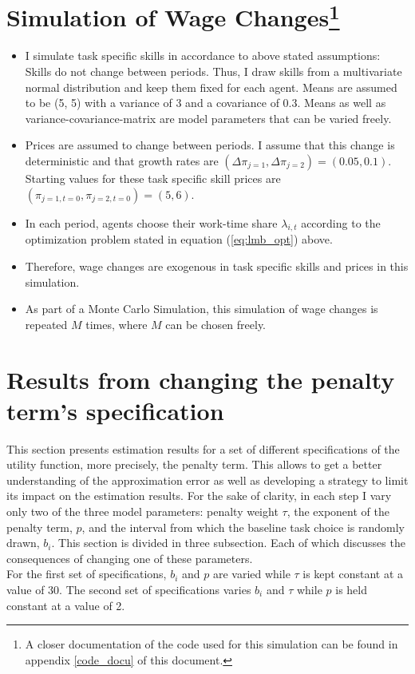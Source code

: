 \documentclass{article}
\begin{document}
\section[Simulation of Wage Changes]{Simulation of Wage Changes\footnote{A closer documentation of the code used for this simulation can be found in appendix \ref{code_docu} of this document.} }
	\begin{itemize}
		\item{I simulate task specific skills in accordance to above stated assumptions: Skills do not change between periods. Thus, I draw skills from a multivariate normal distribution and keep them fixed for each agent. Means are assumed to be (5, 5) with a variance of 3 and a covariance of 0.3. Means as well as variance-covariance-matrix are model parameters that can be varied freely.}
		\item{Prices are assumed to change between periods. I assume that this change is deterministic and that growth rates are $(\Delta \pi_{j=1}, \Delta \pi_{j=2})=(0.05, 0.1)$. Starting values for these task specific skill prices are $(\pi_{j=1, t=0}, \pi_{j=2, t=0})=(5, 6)$.}
		\item{In each period, agents choose their work-time share $\lambda_{i,t}$ according to the optimization problem stated in equation (\ref{eq:lmb_opt}) above.}
		\item{Therefore, wage changes are exogenous in task specific skills and prices in this simulation.}
		\item{As part of a Monte Carlo Simulation, this simulation of wage changes is repeated $M$ times, where $M$ can be chosen freely.}
	\end{itemize}


\section{Results from changing the penalty term's specification}
	This section presents estimation results for a set of different specifications of the utility function, more precisely, the penalty term. This allows to get a better understanding of the approximation error as well as developing a strategy to limit its impact on the estimation results. For the sake of clarity, in each step I vary only two of the three model parameters: penalty weight $\tau$, the exponent of the penalty term, $p$, and the interval from which the baseline task choice is randomly drawn, $b_i$. This section is divided in three subsection. Each of which discusses the consequences of changing one of these parameters. \\
	For the first set of specifications, $b_i$ and $p$ are varied while $\tau$ is kept constant at a value of 30. The second set of specifications varies $b_i$ and $\tau$ while $p$ is held constant at a value of 2. \\ %
\end{document}
